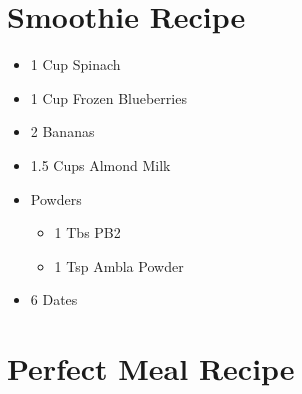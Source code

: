 \documentclass[a4paper,12pt]{book}
\begin{document}
\section[Smoothie]{Smoothie Recipe}
\begin{itemize}
	\item 1 Cup Spinach
	\item 1 Cup Frozen Blueberries
	\item 2 Bananas
	\item 1.5 Cups Almond Milk
	\item Powders
	\begin{itemize}
		\item 1 Tbs PB2
		\item 1 Tsp Ambla Powder
	\end{itemize}
	\item 6 Dates
\end{itemize}





\section{Perfect Meal Recipe}
\end{document}
